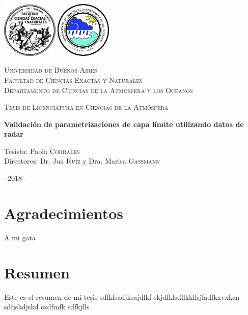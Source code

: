 \documentclass[12pt,spanish,oneside, a4paper]{book}
\title{}
\subtitle{Validación de parametrizaciones de capa límite utilizando datos de radar}
\author{Paola Corrales}
\date{}
\begin{document}
\begin{titlepage}
    \centering
    \includegraphics[width=0.2\textwidth]{logoUBA}  \hfill \includegraphics[width=0.2\textwidth]{logoDCAO} \par
    \vspace{1cm}
    {\scshape\LARGE Universidad de Buenos Aires  \\
    \large Facultad de Ciencias Exactas y Naturales \\
Departamento de Ciencias de la Atmósfera y los Océanos  \par}
    \vspace{0.5cm}
    {\scshape\Large Tesis de Licenciatura en Ciencias de la Atmósfera\par}
    \vspace{1.5cm}
    {\huge\bfseries Validación de parametrizaciones de capa límite utilizando datos de radar\par}
    \vspace{4.5cm}
    {\Large Tesista: Paola \textsc{Corrales} \\
        Directores: Dr. Jua \textsc{Ruíz} y Dra. Marisa \textsc{Gassmann}
    \par}
    \vfill

    {\large --2018--\par}
\end{titlepage}

\renewcommand{\listtablename}{Índice de tablas} 
\renewcommand{\tablename}{Tabla} 

\chapter*{Agradecimientos}

A mi gata

\newpage

\chapter*{Resumen}\begin{center}\begin{minipage}{\dimexpr\paperwidth-7cm}
Este es el resumen de mi tesis sdfklsadjksajdlkf skjdfklsdflkkflsjfadfkxvxkcn  sdfjskdjskd osdfmfk sdfkjlls 
\end{minipage}
\end{center}\newpage
\end{document}
